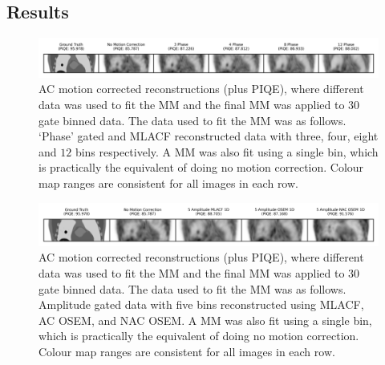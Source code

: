         \subsection{Results} \label{sec:evaluation_of_pet_ct_motion_correction_incorporating_motion_models_using_mlacf_and_complex_gating_schemes_results}
            \begin{figure}
                \centering
                
                \includegraphics[width=1.0\linewidth]{figures/motion_correction_2_results_2_phase_visual_analysis.png}
                
                \captionsetup{singlelinecheck=false}
                \caption{
                    \gls{AC} motion corrected reconstructions (plus \gls{PIQE}), where different data was used to fit the \gls{MM} and the final \gls{MM} was applied to $30$ gate binned data. The data used to fit the \gls{MM} was as follows. `Phase' gated and \gls{MLACF} reconstructed data with three, four, eight and $12$ bins respectively. A \gls{MM} was also fit using a single bin, which is practically the equivalent of doing no motion correction. Colour map ranges are consistent for all images in each row.
                }
                
                \label{fig:evaluation_of_pet_ct_motion_correction_incorporating_motion_models_using_mlacf_and_complex_gating_schemes_results_phase_visual_analysis}
            \end{figure}

            \begin{figure}
                \centering
                
                \includegraphics[width=1.0\linewidth]{figures/motion_correction_2_results_2_5_amplitude_visual_analysis.png}
                
                \captionsetup{singlelinecheck=false}
                \caption{
                    \gls{AC} motion corrected reconstructions (plus \gls{PIQE}), where different data was used to fit the \gls{MM} and the final \gls{MM} was applied to $30$ gate binned data. The data used to fit the \gls{MM} was as follows. Amplitude gated data with five bins reconstructed using \gls{MLACF}, \gls{AC} \gls{OSEM}, and \gls{NAC} \gls{OSEM}. A \gls{MM} was also fit using a single bin, which is practically the equivalent of doing no motion correction. Colour map ranges are consistent for all images in each row.
                }
                
                \label{fig:evaluation_of_pet_ct_motion_correction_incorporating_motion_models_using_mlacf_and_complex_gating_schemes_results_5_amplitude_visual_analysis}
            \end{figure}

